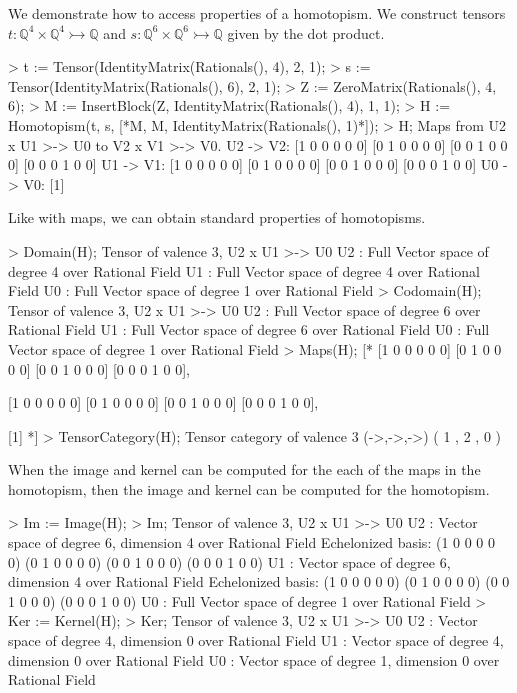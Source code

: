 \begin{example}[HomotopismProps]

We demonstrate how to access properties of a homotopism. 
We construct tensors $t:\mathbb{Q}^4\times\mathbb{Q}^4\rightarrowtail \mathbb{Q}$ and $s:\mathbb{Q}^6\times\mathbb{Q}^6\rightarrowtail\mathbb{Q}$ given by the dot product.
\begin{code}
> t := Tensor(IdentityMatrix(Rationals(), 4), 2, 1);
> s := Tensor(IdentityMatrix(Rationals(), 6), 2, 1);
> Z := ZeroMatrix(Rationals(), 4, 6);
> M := InsertBlock(Z, IdentityMatrix(Rationals(), 4), 1, 1);
> H := Homotopism(t, s, [*M, M, IdentityMatrix(Rationals(), 1)*]);
> H;
Maps from U2 x U1 >-> U0 to V2 x V1 >-> V0.
U2 -> V2: 
[1 0 0 0 0 0]
[0 1 0 0 0 0]
[0 0 1 0 0 0]
[0 0 0 1 0 0]
U1 -> V1: 
[1 0 0 0 0 0]
[0 1 0 0 0 0]
[0 0 1 0 0 0]
[0 0 0 1 0 0]
U0 -> V0: 
[1]
\end{code}

Like with maps, we can obtain standard properties of homotopisms.
\begin{code}
> Domain(H);
Tensor of valence 3, U2 x U1 >-> U0
U2 : Full Vector space of degree 4 over Rational Field
U1 : Full Vector space of degree 4 over Rational Field
U0 : Full Vector space of degree 1 over Rational Field
> Codomain(H);
Tensor of valence 3, U2 x U1 >-> U0
U2 : Full Vector space of degree 6 over Rational Field
U1 : Full Vector space of degree 6 over Rational Field
U0 : Full Vector space of degree 1 over Rational Field
> Maps(H);
[*
    [1 0 0 0 0 0]
    [0 1 0 0 0 0]
    [0 0 1 0 0 0]
    [0 0 0 1 0 0],

    [1 0 0 0 0 0]
    [0 1 0 0 0 0]
    [0 0 1 0 0 0]
    [0 0 0 1 0 0],

    [1]
*]
> TensorCategory(H);
Tensor category of valence 3 (->,->,->) ({ 1 },{ 2 },{ 0 })
\end{code}

When the image and kernel can be computed for the each of the maps in the homotopism, then the image and kernel can be computed for the homotopism.
\begin{code}
> Im := Image(H);
> Im;
Tensor of valence 3, U2 x U1 >-> U0
U2 : Vector space of degree 6, dimension 4 over Rational Field
Echelonized basis:
(1 0 0 0 0 0)
(0 1 0 0 0 0)
(0 0 1 0 0 0)
(0 0 0 1 0 0)
U1 : Vector space of degree 6, dimension 4 over Rational Field
Echelonized basis:
(1 0 0 0 0 0)
(0 1 0 0 0 0)
(0 0 1 0 0 0)
(0 0 0 1 0 0)
U0 : Full Vector space of degree 1 over Rational Field
> Ker := Kernel(H);
> Ker;
Tensor of valence 3, U2 x U1 >-> U0
U2 : Vector space of degree 4, dimension 0 over Rational Field
U1 : Vector space of degree 4, dimension 0 over Rational Field
U0 : Vector space of degree 1, dimension 0 over Rational Field
\end{code}
\end{example}
